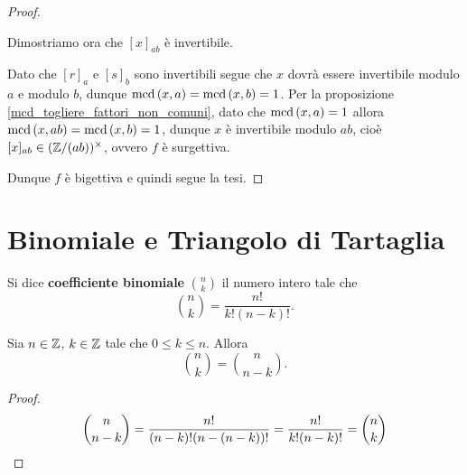 \begin{proof}
\begin{description}
        Dimostriamo ora che $[x]_{ab}$ è invertibile.
                
        Dato che $[r]_a$ e $[s]_b$ sono invertibili segue che $x$ dovrà essere invertibile modulo $a$ e modulo $b$, dunque $\operatorname{mcd}\left(x, a\right) = \operatorname{mcd}\left(x, b\right) = 1$. Per la proposizione \ref{mcd_togliere_fattori_non_comuni}, dato che $\operatorname{mcd}\left(x, a\right) = 1$ allora $\operatorname{mcd}\left(x, ab\right) = \operatorname{mcd}\left(x, b\right) = 1$, dunque $x$ è invertibile modulo $ab$, cioè $[x]_{ab} \in (\mathbb{Z}/(ab))^{\times}$, ovvero $f$ è surgettiva.
    \end{description}

    Dunque $f$ è bigettiva e quindi segue la tesi.
\end{proof}

\section{Binomiale e Triangolo di Tartaglia}

\begin{definition}
    Si dice \textbf{coefficiente binomiale} $\binom{n}{k}$ il numero intero tale che \begin{equation}
        \binom{n}{k} = \frac{n!}{k!(n-k)!}.
    \end{equation}    
\end{definition}

\begin{proposition}\label{simmetria_binomiale}
    Sia $n \in \mathbb{Z}$, $k \in \mathbb{Z}$ tale che $0 \leq k \leq n$. Allora \begin{equation}
        \binom{n}{k} = \binom{n}{n-k}.
    \end{equation}
\end{proposition}
\begin{proof}
    \[\binom{n}{n - k} = \frac{n!}{(n-k)!(n-(n-k))!} = \frac{n!}{k!(n-k)!} = \binom{n}{k} \qedhere\]
\end{proof}

